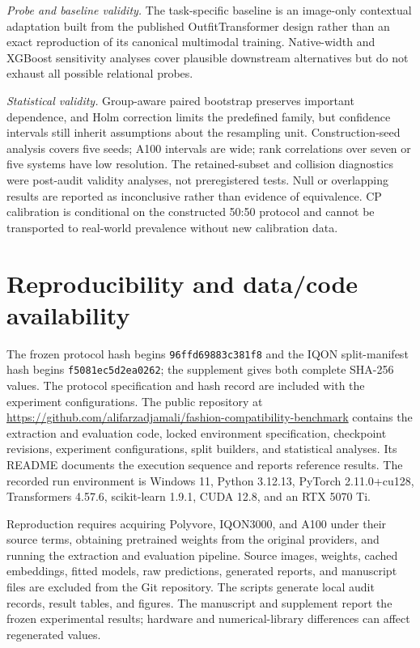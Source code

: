 \documentclass[pdflatex,sn-mathphys-num,iicol]{sn-jnl}
\begin{document}
\textit{Probe and baseline validity.} The task-specific baseline is an image-only contextual adaptation built from the published OutfitTransformer design rather than an exact reproduction of its canonical multimodal training. Native-width and XGBoost sensitivity analyses cover plausible downstream alternatives but do not exhaust all possible relational probes.

\textit{Statistical validity.} Group-aware paired bootstrap preserves important dependence, and Holm correction limits the predefined family, but confidence intervals still inherit assumptions about the resampling unit. Construction-seed analysis covers five seeds; A100 intervals are wide; rank correlations over seven or five systems have low resolution. The retained-subset and collision diagnostics were post-audit validity analyses, not preregistered tests. Null or overlapping results are reported as inconclusive rather than evidence of equivalence. CP calibration is conditional on the constructed 50:50 protocol and cannot be transported to real-world prevalence without new calibration data.

\section{Reproducibility and data/code availability}\label{sec:reproducibility}

The frozen protocol hash begins \texttt{96ffd69883c381f8} and the IQON split-manifest hash begins \texttt{f5081ec5d2ea0262}; the supplement gives both complete SHA-256 values. The protocol specification and hash record are included with the experiment configurations.
The public repository at \url{https://github.com/alifarzadjamali/fashion-compatibility-benchmark} contains the extraction and evaluation code, locked environment specification, checkpoint revisions, experiment configurations, split builders, and statistical analyses. Its README documents the execution sequence and reports reference results. The recorded run environment is Windows 11, Python 3.12.13, PyTorch 2.11.0+cu128, Transformers 4.57.6, scikit-learn 1.9.1, CUDA 12.8, and an RTX 5070 Ti.

Reproduction requires acquiring Polyvore, IQON3000, and A100 under their source terms, obtaining pretrained weights from the original providers, and running the extraction and evaluation pipeline. Source images, weights, cached embeddings, fitted models, raw predictions, generated reports, and manuscript files are excluded from the Git repository. The scripts generate local audit records, result tables, and figures. The manuscript and supplement report the frozen experimental results; hardware and numerical-library differences can affect regenerated values.
\end{document}
